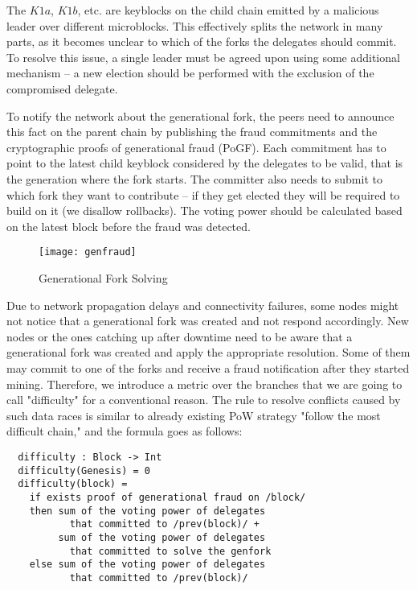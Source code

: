 The $K1a$, $K1b$, etc. are keyblocks on the child chain emitted by a malicious
leader over different microblocks. This
effectively splits the network in many parts, as it becomes unclear to which of
the forks the delegates should commit. To resolve this issue, a single leader
must be agreed upon using some additional mechanism – a new election
should be performed with the exclusion of the compromised delegate.

To notify the network about the generational fork, the peers need to announce
this fact on the parent chain by publishing the fraud commitments and the
cryptographic proofs of generational fraud (PoGF). Each commitment has to point to
the latest child keyblock considered by the delegates to be
valid, that is the generation where the fork starts. The committer also needs
to submit to which fork they want to contribute – if they get elected they
will be required to build on it (we disallow rollbacks). The voting power should be
calculated based on the latest block before the fraud was detected.


\begin{figure}[h]
	\caption{Generational Fork Solving}
	\centering
	\texttt{[image: genfraud]}
\end{figure}

Due to network propagation
delays and connectivity failures, some nodes might not notice that a generational
fork was created and not respond accordingly. New nodes or the ones catching up
after downtime need to be aware that a generational fork was created and apply
the appropriate resolution. Some of them may commit to one of the forks and receive a fraud
notification after they started mining. Therefore, we introduce a metric over the
branches that we are going to call "difficulty" for a conventional reason. The
rule to resolve conflicts caused by such data races is similar to already
existing PoW strategy "follow the most difficult chain," and the formula goes
as follows:

\begin{minipage}{\linewidth}
\begin{lstlisting}
  difficulty : Block -> Int
  difficulty(Genesis) = 0
  difficulty(block) =
    if exists proof of generational fraud on /block/
    then sum of the voting power of delegates
           that committed to /prev(block)/ +
         sum of the voting power of delegates
           that committed to solve the genfork
    else sum of the voting power of delegates
           that committed to /prev(block)/
\end{lstlisting}
\end{minipage}

